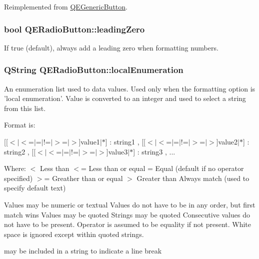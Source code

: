 Reimplemented from \hyperlink{classQEGenericButton}{QEGenericButton}.

\hypertarget{classQERadioButton_a5e6014a2cecf20be7252af365fe8b7c5}{
\subsubsection[{leadingZero}]{\setlength{\rightskip}{0pt plus 5cm}bool QERadioButton::leadingZero}}
\label{classQERadioButton_a5e6014a2cecf20be7252af365fe8b7c5}
If true (default), always add a leading zero when formatting numbers. \hypertarget{classQERadioButton_a73bb9290ed25ce3206dd70fa5b170ba8}{
\subsubsection[{localEnumeration}]{\setlength{\rightskip}{0pt plus 5cm}QString QERadioButton::localEnumeration}}
\label{classQERadioButton_a73bb9290ed25ce3206dd70fa5b170ba8}
An enumeration list used to data values. Used only when the formatting option is 'local enumeration'. Value is converted to an integer and used to select a string from this list.

Format is:

\mbox{[}\mbox{[}$<$$|$$<$=$|$=$|$!=$|$$>$=$|$$>$\mbox{]}value1$|$$\ast$\mbox{]} : string1 , \mbox{[}\mbox{[}$<$$|$$<$=$|$=$|$!=$|$$>$=$|$$>$\mbox{]}value2$|$$\ast$\mbox{]} : string2 , \mbox{[}\mbox{[}$<$$|$$<$=$|$=$|$!=$|$$>$=$|$$>$\mbox{]}value3$|$$\ast$\mbox{]} : string3 , ...

Where: $<$ Less than $<$= Less than or equal = Equal (default if no operator specified) $>$= Greather than or equal $>$ Greater than Always match (used to specify default text)

Values may be numeric or textual Values do not have to be in any order, but first match wins Values may be quoted Strings may be quoted Consecutive values do not have to be present. Operator is assumed to be equality if not present. White space is ignored except within quoted strings. \par
 may be included in a string to indicate a line break


